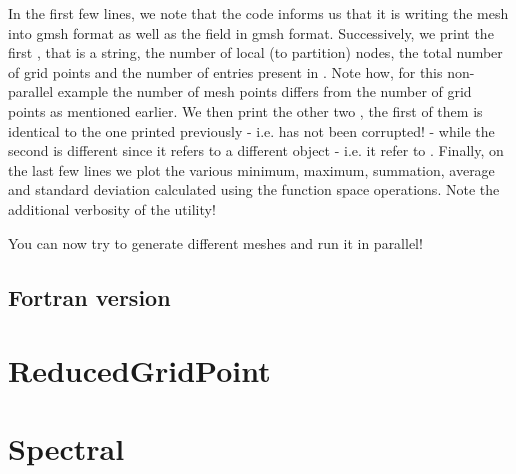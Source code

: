 %
In the first few lines, we note that the code informs us that it is writing
the mesh into gmsh format as well as the field in gmsh format.
Successively, we print the first , that is a string, 
the number of local (to partition) nodes, the total number of grid points 
and the number of entries present in . Note how, for 
this non-parallel example the number of mesh points differs from the number
of grid points as mentioned earlier. We then print the other two ,
the first of them is identical to the one printed previously - i.e. 
 has not been corrupted! - while the second is 
different since it refers to a different object - i.e. it refer to 
.
Finally, on the last few lines we plot the various minimum, maximum, 
summation, average and standard deviation calculated using the 
function space operations.
Note the additional verbosity of the  \Atlas utility!

You can now try to generate different meshes and run it in parallel!

\subsection{Fortran version}



\section{ReducedGridPoint}
\section{Spectral}

